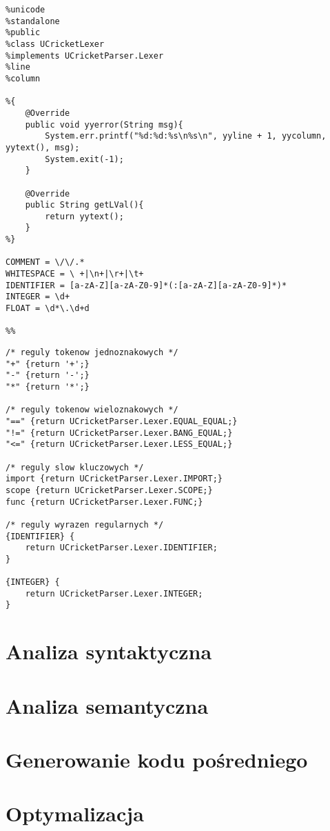 \begin{lstlisting}[caption={Sekcja konfiguracyjna narzędzia JFlex}, label={lst:lexer-konfiguracja}]
%%
%unicode
%standalone
%public
%class UCricketLexer
%implements UCricketParser.Lexer
%line
%column

%{
    @Override
    public void yyerror(String msg){
        System.err.printf("%d:%d:%s\n%s\n", yyline + 1, yycolumn, yytext(), msg);
        System.exit(-1);
    }

    @Override
    public String getLVal(){
        return yytext();
    }
%}

COMMENT = \/\/.*
WHITESPACE = \ +|\n+|\r+|\t+
IDENTIFIER = [a-zA-Z][a-zA-Z0-9]*(:[a-zA-Z][a-zA-Z0-9]*)*
INTEGER = \d+
FLOAT = \d*\.\d+d

%%
\end{lstlisting}

\begin{lstlisting}[caption={Definicje reguł analizatora leksykalnego}, label={lst:lexer-reguły}]
/* reguly tokenow jednoznakowych */
"+" {return '+';}
"-" {return '-';}
"*" {return '*';}

/* reguly tokenow wieloznakowych */
"==" {return UCricketParser.Lexer.EQUAL_EQUAL;}
"!=" {return UCricketParser.Lexer.BANG_EQUAL;}
"<=" {return UCricketParser.Lexer.LESS_EQUAL;} 

/* reguly slow kluczowych */
import {return UCricketParser.Lexer.IMPORT;}
scope {return UCricketParser.Lexer.SCOPE;}
func {return UCricketParser.Lexer.FUNC;}

/* reguly wyrazen regularnych */
{IDENTIFIER} {
    return UCricketParser.Lexer.IDENTIFIER;
}

{INTEGER} {
    return UCricketParser.Lexer.INTEGER;
}
\end{lstlisting}

\section{Analiza syntaktyczna}

\section{Analiza semantyczna}

\section{Generowanie kodu pośredniego}

\section{Optymalizacja}


